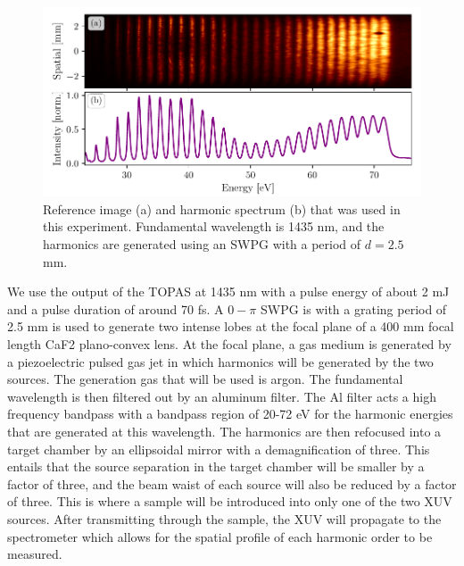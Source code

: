 \begin{figure}
	\centering
	\includegraphics[width=1.0\textwidth]{figures/refractive_index/reference_img_spectrum.pdf}
	\caption[Reference image and spectrum of harmonics used to measure refractive index using SWPG]{Reference image (a) and harmonic spectrum (b) that was used in this experiment.  Fundamental wavelength is 1435 nm, and the harmonics are generated using an SWPG with a period of $d=2.5$ mm.}
	\label{fig:ref_img_spec}
\end{figure}
We use the output of the TOPAS at 1435 nm with a pulse energy of about 2 mJ and a pulse duration of around 70 fs. A $0-\pi$ SWPG is with a grating period of 2.5 mm is used to generate two intense lobes at the focal plane of a 400 mm focal length CaF2 plano-convex lens. At the focal plane, a gas medium is generated by a piezoelectric pulsed gas jet in which harmonics will be generated by the two sources.  The generation gas that will be used is argon. The fundamental wavelength is then filtered out by an aluminum filter.  The Al filter acts a high frequency bandpass with a bandpass region of 20-72 eV for the harmonic energies that are generated at this wavelength.  The harmonics are then refocused into a target chamber by an ellipsoidal mirror with a demagnification of three.  This entails that the source separation in the target chamber will be smaller by a factor of three, and the beam waist of each source will also be reduced by a factor of three.  This is where a sample will be introduced into only one of the two XUV sources.  After transmitting through the sample, the XUV will propagate to the spectrometer which allows for the spatial profile of each harmonic order to be measured.

